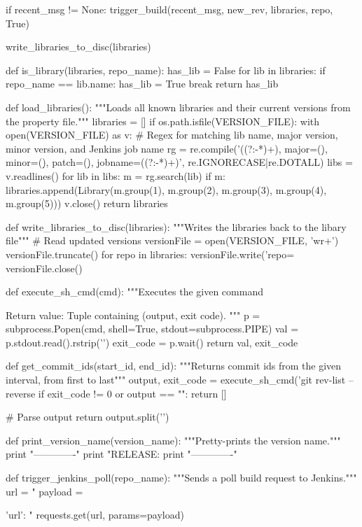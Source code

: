 \begin{pythoncode}[caption=Post-receive git hook for managing library releases and triggering Jenkins (written in Python)]
        if recent_msg != None:
            trigger_build(recent_msg, new_rev, libraries, repo, True)

    write_libraries_to_disc(libraries)

def is_library(libraries, repo_name):
    has_lib = False
    for lib in libraries:
        if repo_name == lib.name:
            has_lib = True
            break
    return has_lib

def load_libraries():
    """Loads all known libraries and their current versions from the property file."""
    libraries = []
    if os.path.isfile(VERSION_FILE):
        with open(VERSION_FILE) as v:
            # Regex for matching lib name, major version, minor version, and Jenkins job name
            rg = re.compile('((?:\w*-*)+), major=(\d*), minor=(\d*), patch=(\d*), jobname=((?:\w*-*)+)', re.IGNORECASE|re.DOTALL)
            libs = v.readlines()
            for lib in libs:
                m = rg.search(lib)
                if m:
                    libraries.append(Library(m.group(1), m.group(2), m.group(3), m.group(4), m.group(5)))
            v.close()
    return libraries

def write_libraries_to_disc(libraries):
    """Writes the libraries back to the libary file"""
    # Read updated versions
    versionFile = open(VERSION_FILE, 'wr+')
    versionFile.truncate()
    for repo in libraries:
        versionFile.write('repo=%
    versionFile.close()

def execute_sh_cmd(cmd):
    """Executes the given command

    Return value: Tuple containing (output, exit code).
    """
    p = subprocess.Popen(cmd, shell=True, stdout=subprocess.PIPE)
    val = p.stdout.read().rstrip('\n')
    exit_code = p.wait()
    return val, exit_code

def get_commit_ids(start_id, end_id):
    """Returns commit ids from the given interval, from first to last"""
    output, exit_code = execute_sh_cmd('git rev-list --reverse %
    if exit_code != 0 or output == "":
        return []

    # Parse output
    return output.split('\n')


def print_version_name(version_name):
    """Pretty-prints the version name."""
    print "-------------"
    print "RELEASE: %
    print "-------------"

def trigger_jenkins_poll(repo_name):
    """Sends a poll build request to Jenkins."""
    url = "%
    payload = {'url': "%
    requests.get(url, params=payload)

}
\end{pythoncode}
